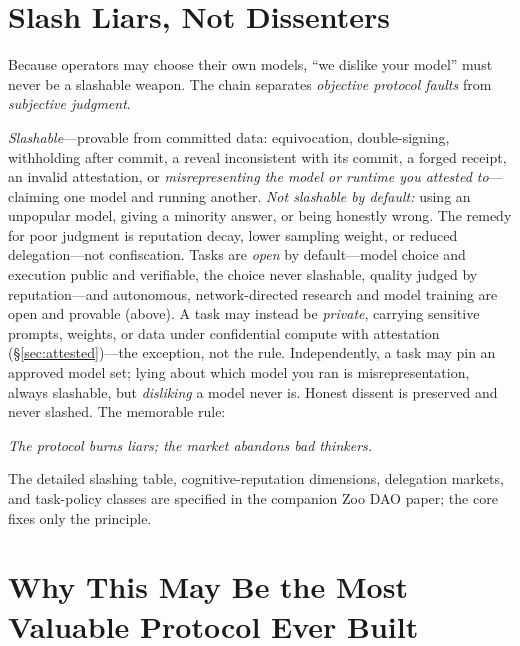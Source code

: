 \documentclass[11pt]{article}
\begin{document}
\section{Slash Liars, Not Dissenters}

Because operators may choose their own models, ``we dislike your model'' must never be a slashable weapon. The chain separates \emph{objective protocol faults} from \emph{subjective judgment}.

\emph{Slashable}---provable from committed data: equivocation, double-signing, withholding after commit, a reveal inconsistent with its commit, a forged receipt, an invalid attestation, or \emph{misrepresenting the model or runtime you attested to}---claiming one model and running another. \emph{Not slashable by default:} using an unpopular model, giving a minority answer, or being honestly wrong. The remedy for poor judgment is reputation decay, lower sampling weight, or reduced delegation---not confiscation. Tasks are \emph{open} by default---model choice and execution public and verifiable, the choice never slashable, quality judged by reputation---and autonomous, network-directed research and model training are open and provable (above). A task may instead be \emph{private}, carrying sensitive prompts, weights, or data under confidential compute with attestation (\S\ref{sec:attested})---the exception, not the rule. Independently, a task may pin an approved model set; lying about which model you ran is misrepresentation, always slashable, but \emph{disliking} a model never is. Honest dissent is preserved and never slashed. The memorable rule:

\begin{center}\emph{The protocol burns liars; the market abandons bad thinkers.}\end{center}

\noindent The detailed slashing table, cognitive-reputation dimensions, delegation markets, and task-policy classes are specified in the companion Zoo DAO paper; the core fixes only the principle.

\section{Why This May Be the Most Valuable Protocol Ever Built}
\end{document}
